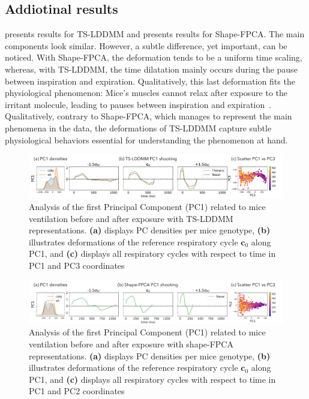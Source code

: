 \subsection{Addiotinal results}
 presents results for TS-LDDMM and   presents results for Shape-FPCA.
The main components look similar. However, a subtle difference, yet important, can be noticed. With Shape-FPCA, the deformation tends to be a uniform time scaling, whereas, with TS-LDDMM, the time dilatation mainly occurs during the pause between inspiration and expiration. Qualitatively, this last deformation fits the physiological phenomenon: Mice's muscles cannot relax after exposure to the irritant molecule, leading to pauses between inspiration and expiration~\cite{nervo2019respiratory}. Qualitatively, contrary to Shape-FPCA, which manages to represent the main phenomena in the data, the deformations of TS-LDDMM capture subtle physiological behaviors essential for understanding the phenomenon at hand.

\begin{figure}
  \centering
  \includegraphics[width = \linewidth]{pictures/exp after/exp after.pdf}
  \caption{Analysis of the first Principal Component (PC1) related to mice ventilation before and after exposure with TS-LDDMM representations. \textbf{(a)} displays PC densities per mice genotype, \textbf{(b)} illustrates deformations of the reference respiratory cycle $\mathbf{c}_0$ along PC1, and \textbf{(c)} displays all respiratory cycles with respect to time in PC1 and PC3 coordinates}
  \label{fig: after tslddmm}
\end{figure}

\begin{figure}
  \centering
  \includegraphics[width = \linewidth]{pictures/exp after/exp after fpca.pdf}
  \caption{Analysis of the first Principal Component (PC1) related to mice ventilation before and after exposure with shape-FPCA representations. \textbf{(a)} displays PC densities per mice genotype, \textbf{(b)} illustrates deformations of the reference respiratory cycle $\mathbf{c}_0$ along PC1, and \textbf{(c)} displays all respiratory cycles with respect to time in PC1 and PC2 coordinates}
  \label{fig: after shapefpca}
\end{figure}

